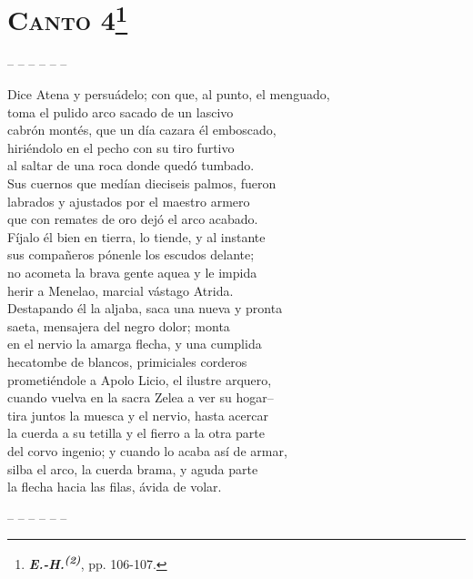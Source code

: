 \documentclass[11pt,twoside]{article}
\newcommand{\ehdos}{\emph{\textbf{E.-H.\textsuperscript{(2)}}}}
\begin{document}
\section*{\centering\textbf{\textsc{Canto} 4}\footnote{\ehdos, pp. 106-107.}}
%
\noindent-- -- -- -- -- --\par
%
\beginnumbering
\pstart
{}
Dice Atena y persuádelo; con que, al punto, el menguado,\\
toma el pulido arco sacado de un lascivo\\
cabrón montés, que un día cazara él emboscado,\\
hiriéndolo en el pecho con su tiro furtivo\\
al saltar de una roca donde quedó tumbado.\\
Sus cuernos que medían dieciseis palmos, fueron\\
labrados y ajustados por el maestro armero\\
que con remates de oro dejó el arco acabado.\\
Fíjalo él bien en tierra, lo tiende, y al instante\\
sus compañeros pónenle los escudos delante;\\
no acometa la brava gente aquea y le impida\\
herir a Menelao, marcial vástago Atrida.\\
Destapando él la aljaba, saca una nueva y pronta\\
saeta, mensajera del negro dolor; monta\\
en el nervio la amarga flecha, y una cumplida\\
hecatombe de blancos, primiciales corderos\\
prometiéndole a Apolo Licio, el ilustre arquero,\\
cuando vuelva en la sacra Zelea a ver su hogar--\\
tira juntos la muesca y el nervio, hasta acercar\\
la cuerda a su tetilla y el fierro a la otra parte\\
del corvo ingenio; y cuando lo acaba así de armar,\\
silba el arco, la cuerda brama, y aguda parte\\
la flecha hacia las filas, ávida de volar.\par
\pend
\endnumbering
%
\noindent-- -- -- -- -- --\par
%
\newpage
%
\end{document}

